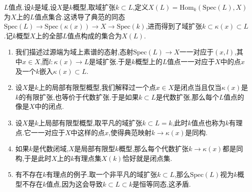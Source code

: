 $L$值点.设$k$是域,设$X$是$k$概型,取域扩张$k\subset L$,定义$X(L)=\mathrm{Hom}_k(\mathrm{Spec}(L),X)$为$X$上的$L$值点集合.这诱导了典范的同态$\mathrm{Spec}(L)\to\mathrm{Spec}(\kappa(x))\to X\to\mathrm{Spec}(k)$,进而得到了域扩张$k\subset\kappa(x)\subset L$.记$k$概型$X$上的全部$L$值点构成的集合为$X(L)$.
\begin{enumerate}
	\item 我们描述过源端为域上素谱的态射,态射$\mathrm{Spec}(L)\to X$一一对应于$(x,l)$,其中$x\in X$,而$l:\kappa(x)\to L$是域扩张.于是$k$概型上的$L$值点一一对应于$X$中的点$x$及一个$k$嵌入$\kappa(x)\subset L$.
	\item 设$X$是$k$上的局部有限型概型,我们解释过一个点$x\in X$是闭点当且仅当$\kappa(x)$是$k$的有限扩张,也等价于代数扩张.于是如果$k\subset L$是代数扩张,那么每个$L$值点的像是$X$中的闭点.
	\item 设$X$是$k$上局部有限型概型,取平凡的域扩张$k\subset L=k$,此时$k$值点也称为$k$有理点.它一一对应于$X$中这样的点$x$,使得典范映射$k\to\kappa(x)$是同构.
	\item 如果$k$是代数闭域,$X$是局部有限型$k$概型,那么每个代数扩张$k\to\kappa(x)$都是同构,于是此时$X$上的$k$有理点集$X(k)$恰好就是闭点集.
	\item 有不存在$k$有理点的例子.取一个非平凡的域扩张$k\subset L$,那么$\mathrm{Spec}(L)$视为$k$概型不存在$k$值点,因为这会导致$k\subset L\subset k$是恒等同态,这矛盾.
\end{enumerate}

